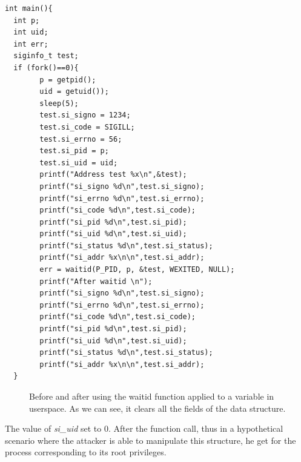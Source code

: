 \documentclass{masterthesis}
\begin{document}
\begin{lstlisting}
int main(){
  int p;
  int uid;
  int err;
  siginfo_t test;
  if (fork()==0){
        p = getpid();
        uid = getuid());
        sleep(5);
        test.si_signo = 1234;
        test.si_code = SIGILL;
        test.si_errno = 56;
        test.si_pid = p;
        test.si_uid = uid;
        printf("Address test %x\n",&test);
        printf("si_signo %d\n",test.si_signo);
        printf("si_errno %d\n",test.si_errno);
        printf("si_code %d\n",test.si_code);
        printf("si_pid %d\n",test.si_pid);
        printf("si_uid %d\n",test.si_uid);
        printf("si_status %d\n",test.si_status);
        printf("si_addr %x\n\n",test.si_addr);
        err = waitid(P_PID, p, &test, WEXITED, NULL);
        printf("After waitid \n");
        printf("si_signo %d\n",test.si_signo);
        printf("si_errno %d\n",test.si_errno);
        printf("si_code %d\n",test.si_code);
        printf("si_pid %d\n",test.si_pid);
        printf("si_uid %d\n",test.si_uid);
        printf("si_status %d\n",test.si_status);
        printf("si_addr %x\n\n",test.si_addr);
  }
\end{lstlisting}
\begin{figure}[h!]
\caption{Before and after using the waitid function applied to a variable in userspace. As we can see, it clears all the fields of the data structure.}
   \label{waitid_show}
\end{figure} 

The value of \textit{si\_uid} set to 0. After the function call, thus in a hypothetical scenario where the attacker is able to manipulate this structure, he get for the process corresponding to its root privileges.
\end{document}
